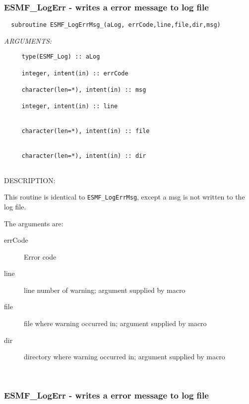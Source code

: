 \subsubsection [ESMF\_LogErr] {ESMF\_LogErr - writes a error message to log file}


 
\begin{verbatim}  subroutine ESMF_LogErrMsg_(aLog, errCode,line,file,dir,msg)
 \end{verbatim}{\em ARGUMENTS:}
\begin{verbatim}     type(ESMF_Log) :: aLog
 
     integer, intent(in) :: errCode       
 
     character(len=*), intent(in) :: msg   
 
     integer, intent(in) :: line            
                                            
 
     character(len=*), intent(in) :: file   
                                           
 
     character(len=*), intent(in) :: dir   
                                           
 \end{verbatim}
{\sf DESCRIPTION:\\ }


     This routine is identical to {\tt ESMF\_LogErrMsg}, except a msg is
     not written to the log file.
  
     The arguments are:
     \begin{description}
  
     \item[errCode]
     Error code   
  
     \item[line]
     line number of warning; argument supplied by macro
  
     \item[file]
     file where warning occurred in; argument supplied by macro
  
     \item[dir]
     directory where warning occurred in; argument supplied by macro
  
     \end{description} 
 
\mbox{}\hrulefill\ 
 
\subsubsection [ESMF\_LogErr] {ESMF\_LogErr - writes a error message to log file}


